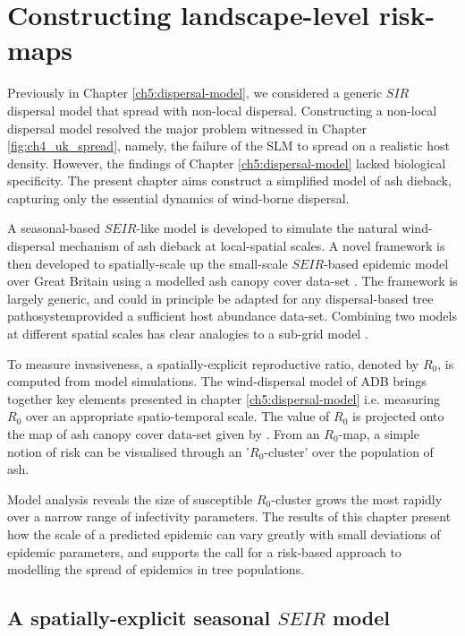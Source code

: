 \chapter{Constructing landscape-level risk-maps}

Previously in Chapter \ref{ch5:dispersal-model}, we considered a generic $SIR$ dispersal model that spread with non-local dispersal. 
Constructing a non-local dispersal model resolved the major problem witnessed in Chapter \ref{fig:ch4_uk_spread}, namely, the failure of the SLM to spread on a realistic host density. 
However, the findings of Chapter \ref{ch5:dispersal-model} lacked biological specificity.
The present chapter aims construct a simplified model of ash dieback, capturing only the essential dynamics of wind-borne dispersal.

A seasonal-based $SEIR$-like model is developed to simulate the natural wind-dispersal mechanism of ash dieback at local-spatial scales. 
A novel framework is then developed to spatially-scale up the small-scale $SEIR$-based epidemic model over Great Britain using a modelled ash canopy cover data-set \cite{hill.data}.
The framework is largely generic, and could in principle be adapted for any dispersal-based tree pathosystem\textemdash provided a sufficient host abundance data-set.
Combining two models at different spatial scales has clear analogies to a sub-grid model \cite{sub-grid}.
 
To measure invasiveness, a spatially-explicit reproductive ratio, denoted by $R_0$, is computed from model simulations.
The wind-dispersal model of ADB brings together key elements presented in chapter \ref{ch5:dispersal-model} i.e. measuring $R_0$ over an appropriate spatio-temporal scale.
The value of $R_0$ is projected onto the map of ash canopy cover data-set given by \cite{hill.data}.
From an $R_0$-map, a simple notion of risk can be visualised through an '$R_0$-cluster' over the population of ash.

Model analysis reveals the size of susceptible $R_0$-cluster grows the most rapidly over a narrow range of infectivity parameters.
The results of this chapter present how the scale of a predicted epidemic can vary greatly with small deviations of epidemic parameters,
and supports the call for a risk-based approach to modelling the spread of epidemics in tree populations.

\section{A spatially-explicit seasonal $SEIR$ model}

